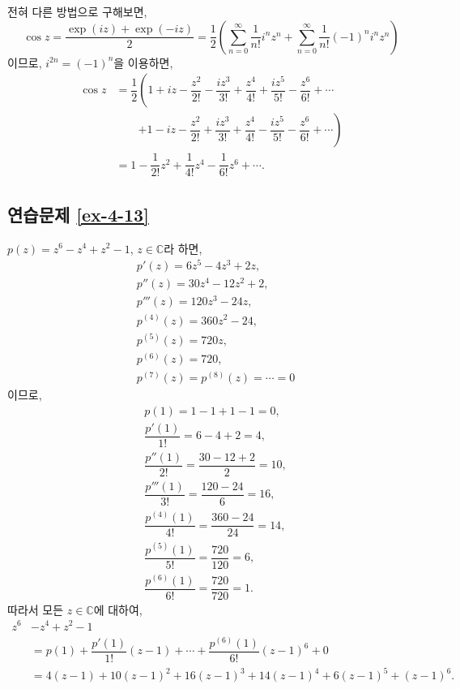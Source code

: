 전혀 다른 방법으로 구해보면,
\[
\cos z = \dfrac{\exp(iz)  + \exp(-iz)}2 
= \dfrac12 \left( \sum_{n=0}^\infty \dfrac1{n!}i^nz^n 
+ \sum_{n=0}^\infty \dfrac1{n!}(-1)^ni^nz^n \right)
\]
이므로, $i^{2n} = (-1)^n$을 이용하면,
\begin{align*}
\cos z &= \dfrac12 \left(
1+ iz - \dfrac{z^2}{2!} - \dfrac{iz^3}{3!} + \dfrac{z^4}{4!} \right.
+ \dfrac{iz^5}{5!} - \dfrac{z^6}{6!}  + \cdots \\
&\qquad\left. +1 - iz - \dfrac{z^2}{2!} + \dfrac{iz^3}{3!} + \dfrac{z^4}{4!} 
- \dfrac{iz^5}{5!} - \dfrac{z^6}{6!}  + \cdots \right) \\
&= 1 - \dfrac1{2!}z^2 + \dfrac1{4!}z^4 - \dfrac1{6!}z^6 + \cdots.
\end{align*}

\subsection*{연습문제 \ref{ex-4-13}}

$p(z) = z^6 -z^4 +z^2 -1$, $z\in \mathbb C$라 하면,
\begin{align*}
& p'(z) = 6z^5 - 4z^3 +2z, \\
& p''(z) = 30z^4 -12z^2 + 2, \\
&p'''(z) = 120z^3 - 24z, \\
&p^{(4)}(z) = 360z^2 - 24, \\
&p^{(5)}(z) = 720z, \\
&p^{(6)}(z) = 720, \\
&p^{(7)}(z) = p^{(8)}(z) = \cdots = 0
\end{align*}
이므로,
\begin{align*}
&p(1) = 1-1+1-1 = 0, \\
&\dfrac{p'(1)}{1!} = 6 - 4 + 2 = 4, \\
&\dfrac{p''(1)}{2!} = \dfrac{30-12+2}{2} = 10, \\
&\dfrac{p'''(1)}{3!} = \dfrac{120-24}{6} = 16, \\
&\dfrac{p^{(4)}(1)}{4!} = \dfrac{360-24}{24} = 14, \\
&\dfrac{p^{(5)}(1)}{5!} = \dfrac{720}{120} = 6, \\
&\dfrac{p^{(6)}(1)}{6!} = \dfrac{720}{720} = 1.
\end{align*}
따라서 모든 $z\in\mathbb C$에 대하여,
\begin{align*}
z^6&-z^4+z^2-1 \\
&= p(1) + \dfrac{p'(1)}{1!}(z-1) + \cdots + \dfrac{p^{(6)}(1)}{6!}(z-1)^6 + 0 \\
&= 4(z-1) + 10(z-1)^2 + 16(z-1)^3 + 14(z-1)^4 + 6(z-1)^5 + (z-1)^6.
\end{align*}

